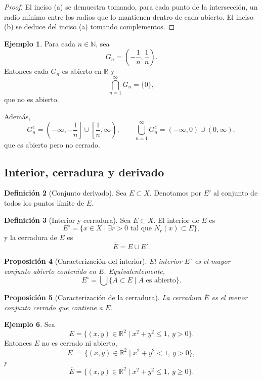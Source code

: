\documentclass[12pt]{article}
\theoremstyle{definition}
\newtheorem{definition}{Definición}[section]
\newtheorem{example}[definition]{Ejemplo}
\theoremstyle{plain}
\newtheorem{proposition}[definition]{Proposición}
\theoremstyle{remark}
\begin{document}
\begin{proof}
El inciso (a) se demuestra tomando, para cada punto de la intersección, un radio mínimo entre los radios que lo mantienen dentro de cada abierto.
El inciso (b) se deduce del inciso (a) tomando complementos.
\end{proof}

\begin{example}
Para cada $n\in\mathbb N$, sea
\[
G_n=\left(-\frac1n,\frac1n\right).
\]
Entonces cada $G_n$ es abierto en $\mathbb R$ y
\[
\bigcap_{n=1}^\infty G_n=\{0\},
\]
que no es abierto.

Además,
\[
G_n^c=\left(-\infty,-\frac1n\right]\cup\left[\frac1n,\infty\right),
\qquad
\bigcup_{n=1}^\infty G_n^c=(-\infty,0)\cup(0,\infty),
\]
que es abierto pero no cerrado.
\end{example}

\subsection*{Interior, cerradura y derivado}

\begin{definition}[Conjunto derivado]
Sea $E\subset X$. Denotamos por $E'$ al conjunto de todos los puntos límite de $E$.
\end{definition}

\begin{definition}[Interior y cerradura]
Sea $E\subset X$. El interior de $E$ es
\[
E^\circ=\{x\in X\mid \exists r>0 \text{ tal que } N_r(x)\subset E\},
\]
y la cerradura de $E$ es
\[
\overline E=E\cup E'.
\]
\end{definition}

\begin{proposition}[Caracterización del interior]
El interior $E^\circ$ es el mayor conjunto abierto contenido en $E$.
Equivalentemente,
\[
E^\circ=\bigcup\{A\subset E\mid A \text{ es abierto}\}.
\]
\end{proposition}

\begin{proposition}[Caracterización de la cerradura]
La cerradura $\overline E$ es el menor conjunto cerrado que contiene a $E$.
\end{proposition}

\begin{example}
Sea
\[
E=\{(x,y)\in\mathbb R^2\mid x^2+y^2\le 1,\ y>0\}.
\]
Entonces $E$ no es cerrado ni abierto,
\[
E^\circ=\{(x,y)\in\mathbb R^2\mid x^2+y^2<1,\ y>0\},
\]
y
\[
\overline E=\{(x,y)\in\mathbb R^2\mid x^2+y^2\le 1,\ y\ge 0\}.
\]
\end{example}
\end{document}
